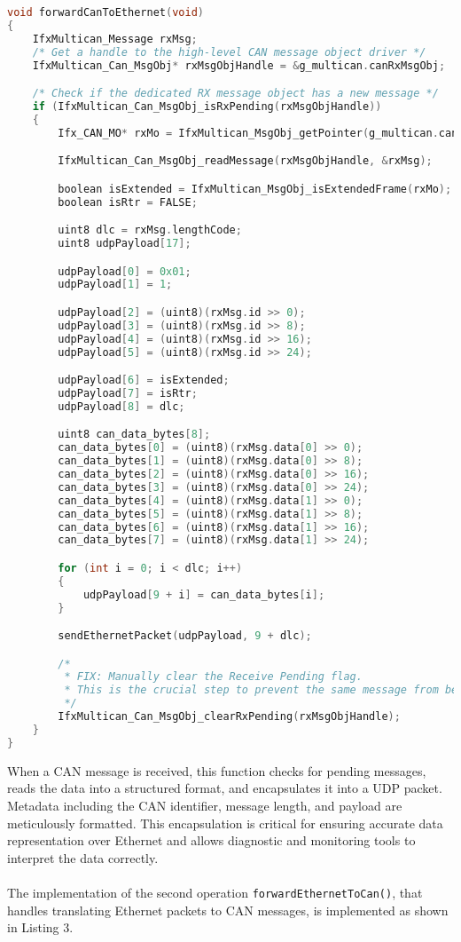 \begin{lstlisting}[language=C, caption={CAN to Ethernet message translation (Gateway.c)}, label={lst:can_to_eth}]
void forwardCanToEthernet(void)
{
    IfxMultican_Message rxMsg;
    /* Get a handle to the high-level CAN message object driver */
    IfxMultican_Can_MsgObj* rxMsgObjHandle = &g_multican.canRxMsgObj;

    /* Check if the dedicated RX message object has a new message */
    if (IfxMultican_Can_MsgObj_isRxPending(rxMsgObjHandle))
    {
        Ifx_CAN_MO* rxMo = IfxMultican_MsgObj_getPointer(g_multican.can.mcan, rxMsgObjHandle->msgObjId);

        IfxMultican_Can_MsgObj_readMessage(rxMsgObjHandle, &rxMsg);

        boolean isExtended = IfxMultican_MsgObj_isExtendedFrame(rxMo);
        boolean isRtr = FALSE;

        uint8 dlc = rxMsg.lengthCode;
        uint8 udpPayload[17];

        udpPayload[0] = 0x01;
        udpPayload[1] = 1;

        udpPayload[2] = (uint8)(rxMsg.id >> 0);
        udpPayload[3] = (uint8)(rxMsg.id >> 8);
        udpPayload[4] = (uint8)(rxMsg.id >> 16);
        udpPayload[5] = (uint8)(rxMsg.id >> 24);

        udpPayload[6] = isExtended;
        udpPayload[7] = isRtr;
        udpPayload[8] = dlc;

        uint8 can_data_bytes[8];
        can_data_bytes[0] = (uint8)(rxMsg.data[0] >> 0);
        can_data_bytes[1] = (uint8)(rxMsg.data[0] >> 8);
        can_data_bytes[2] = (uint8)(rxMsg.data[0] >> 16);
        can_data_bytes[3] = (uint8)(rxMsg.data[0] >> 24);
        can_data_bytes[4] = (uint8)(rxMsg.data[1] >> 0);
        can_data_bytes[5] = (uint8)(rxMsg.data[1] >> 8);
        can_data_bytes[6] = (uint8)(rxMsg.data[1] >> 16);
        can_data_bytes[7] = (uint8)(rxMsg.data[1] >> 24);

        for (int i = 0; i < dlc; i++)
        {
            udpPayload[9 + i] = can_data_bytes[i];
        }

        sendEthernetPacket(udpPayload, 9 + dlc);

        /*
         * FIX: Manually clear the Receive Pending flag.
         * This is the crucial step to prevent the same message from being read again.
         */
        IfxMultican_Can_MsgObj_clearRxPending(rxMsgObjHandle);
    }
}
\end{lstlisting}
When a CAN message is received, this function checks for pending messages, reads the data into a structured format, and encapsulates it into a UDP packet. Metadata including the CAN identifier, message length, and payload are meticulously formatted. This encapsulation is critical for ensuring accurate data representation over Ethernet and allows diagnostic and monitoring tools to interpret the data correctly.\\\\
The implementation of the second operation \verb|forwardEthernetToCan()|, that handles translating Ethernet packets to CAN messages, is implemented as shown in Listing 3.

